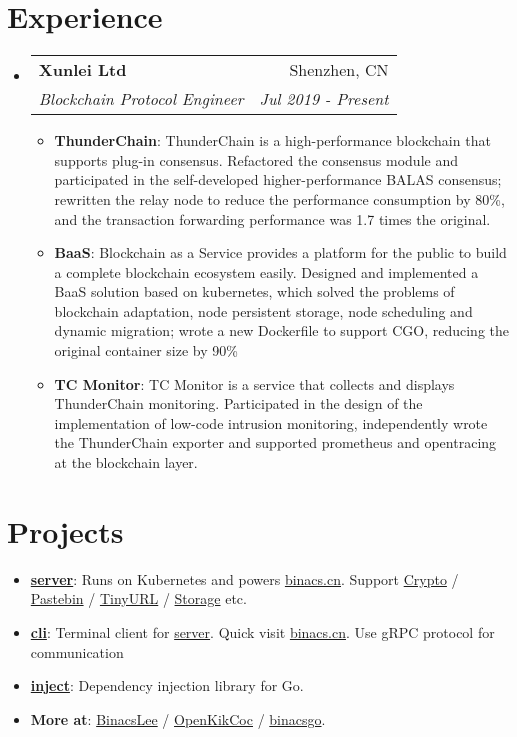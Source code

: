 \documentclass[letterpaper,12pt]{article}
\makeatletter
\newcommand{\resumeItem}[2]{
  \item\small{
    \textbf{#1}{: #2 \vspace{-2pt}}
  }
}
\newcommand{\resumeSubheading}[4]{
  \vspace{-1pt}\item
    \begin{tabular*}{0.97\textwidth}[t]{l@{\extracolsep{\fill}}r}
      \textbf{#1} & #2 \\
      \textit{\small#3} & \textit{\small #4} \\
    \end{tabular*}\vspace{-5pt}
}
\newcommand{\resumeSubItem}[2]{\resumeItem{#1}{#2}\vspace{-4pt}}
\newcommand{\resumeSubHeadingListStart}{\begin{itemize}[leftmargin=*]}
\newcommand{\resumeSubHeadingListEnd}{\end{itemize}}
\newcommand{\resumeItemListStart}{\begin{itemize}}
\newcommand{\resumeItemListEnd}{\end{itemize}\vspace{-5pt}}
\makeatother
\begin{document}
\section{Experience}
  \resumeSubHeadingListStart
    \resumeSubheading
      {Xunlei Ltd}{Shenzhen, CN}
      {Blockchain Protocol Engineer}{Jul 2019 - Present}
      \resumeItemListStart
        \resumeItem{ThunderChain}
          {ThunderChain is a high-performance blockchain that supports plug-in consensus.
          Refactored the consensus module and participated in the self-developed higher-performance
          BALAS consensus; rewritten the relay node to reduce the performance consumption by 80\%,
          and the transaction forwarding performance was 1.7 times the original.}
        \resumeItem{BaaS}
          {Blockchain as a Service provides a platform for the public to build a
          complete blockchain ecosystem easily.
          Designed and implemented a BaaS solution based on kubernetes, which solved the problems of
          blockchain adaptation, node persistent storage, node scheduling and dynamic migration; wrote
          a new Dockerfile to support CGO, reducing the original container size by 90\%}
        \resumeItem{TC Monitor}
          {TC Monitor is a service that collects and displays ThunderChain monitoring. Participated in
          the design of the implementation of low-code intrusion monitoring, independently wrote the
          ThunderChain exporter and supported prometheus and opentracing at the blockchain layer.}
      \resumeItemListEnd
  \resumeSubHeadingListEnd

\section{Projects}
  \resumeSubHeadingListStart
    \resumeSubItem{\href{https://github.com/BinacsLee/server}{server}}
      {Runs on Kubernetes and powers \href{https://binacs.cn/}{binacs.cn}.
      Support   \href{https://binacs.cn/toys/crypto}{Crypto} / 
                \href{https://binacs.cn/toys/pastebin}{Pastebin} / 
                \href{https://binacs.cn/toys/tinyurl}{TinyURL} / 
                \href{https://binacs.cn/toys/storage}{Storage}
      etc.}
    \resumeSubItem{\href{https://github.com/BinacsLee/cli}{cli}}
      {Terminal client for \href{https://github.com/BinacsLee/server}{server}. Quick visit
      \href{https://binacs.cn/}{binacs.cn}. Use gRPC protocol for communication}
    \resumeSubItem{\href{https://github.com/binacsgo/inject}{inject}}
      {Dependency injection library for Go.}
    \resumeSubItem{More at}
      {\href{https://github.com/BinacsLee}{BinacsLee} /
       \href{https://github.com/OpenKikCoc}{OpenKikCoc} /
       \href{https://github.com/binacsgo}{binacsgo}.}
  \resumeSubHeadingListEnd

\end{document}
